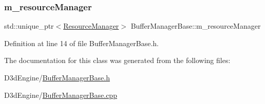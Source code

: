 \subsubsection{\texorpdfstring{m\+\_\+resource\+Manager}{m\_resourceManager}}
{\footnotesize\ttfamily std\+::unique\+\_\+ptr$<$\mbox{\hyperlink{class_resource_manager}{Resource\+Manager}}$>$ Buffer\+Manager\+Base\+::m\+\_\+resource\+Manager\hspace{0.3cm}{\ttfamily [private]}}



Definition at line 14 of file Buffer\+Manager\+Base.\+h.



The documentation for this class was generated from the following files\+:\begin{DoxyCompactItemize}
\item 
D3d\+Engine/\mbox{\hyperlink{_buffer_manager_base_8h}{Buffer\+Manager\+Base.\+h}}\item 
D3d\+Engine/\mbox{\hyperlink{_buffer_manager_base_8cpp}{Buffer\+Manager\+Base.\+cpp}}\end{DoxyCompactItemize}
